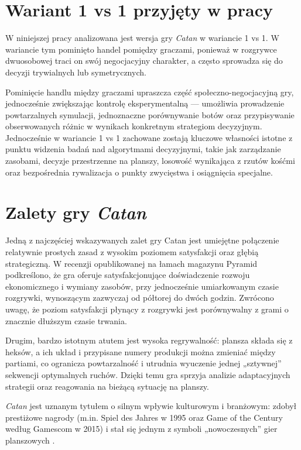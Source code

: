 \documentclass[polish,inz,longabstract]{iithesis}
\begin{document}
\section{Wariant 1 vs 1 przyjęty w pracy}

W niniejszej pracy analizowana jest wersja gry \textit{Catan} w wariancie 1 vs 1. W wariancie tym pominięto handel pomiędzy graczami, ponieważ w rozgrywce dwuosobowej traci on swój negocjacyjny charakter, a często sprowadza się do decyzji trywialnych lub symetrycznych.

Pominięcie handlu między graczami upraszcza część społeczno-negocjacyjną gry, jednocześnie zwiększając kontrolę eksperymentalną — umożliwia prowadzenie powtarzalnych symulacji, jednoznaczne porównywanie botów oraz przypisywanie obserwowanych różnic w wynikach konkretnym strategiom decyzyjnym. Jednocześnie w wariancie 1 vs 1 zachowane zostają kluczowe własności istotne z punktu widzenia badań nad algorytmami decyzyjnymi, takie jak zarządzanie zasobami, decyzje przestrzenne na planszy, losowość wynikająca z rzutów kośćmi oraz bezpośrednia rywalizacja o punkty zwycięstwa i osiągnięcia specjalne.

\section{Zalety gry \textit{Catan}}

Jedną z najczęściej wskazywanych zalet gry Catan jest umiejętne połączenie relatywnie prostych zasad z wysokim poziomem satysfakcji oraz głębią strategiczną. W recenzji opublikowanej na łamach magazynu Pyramid podkreślono, że gra oferuje satysfakcjonujące doświadczenie rozwoju ekonomicznego i wymiany zasobów, przy jednocześnie umiarkowanym czasie rozgrywki, wynoszącym zazwyczaj od półtorej do dwóch godzin. Zwrócono uwagę, że poziom satysfakcji płynący z rozgrywki jest porównywalny z grami o znacznie dłuższym czasie trwania.

Drugim, bardzo istotnym atutem jest wysoka regrywalność: plansza składa się z heksów, a ich układ i przypisane numery produkcji można zmieniać między partiami, co ogranicza powtarzalność i utrudnia wyuczenie jednej „sztywnej” sekwencji optymalnych ruchów. Dzięki temu gra sprzyja analizie adaptacyjnych strategii oraz reagowania na bieżącą sytuację na planszy.

\textit{Catan} jest uznanym tytułem o silnym wpływie kulturowym i branżowym: zdobył prestiżowe nagrody (m.in. Spiel des Jahres w 1995 oraz Game of the Century według Gamescom w 2015) i stał się jednym z symboli „nowoczesnych” gier planszowych \cite{9}.
\end{document}
